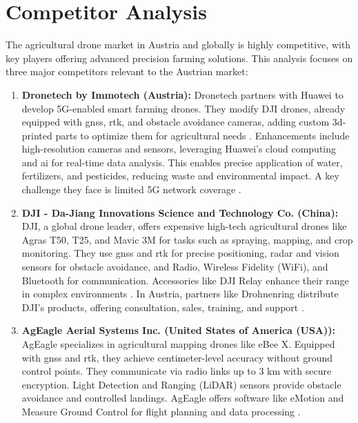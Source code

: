 \section{Competitor Analysis}

The agricultural drone market in Austria and globally is highly competitive, with key players offering advanced precision farming solutions. This analysis focuses on three major competitors relevant to the Austrian market:

\begin{enumerate} 
	\item \textbf{Dronetech by Immotech (Austria):} Dronetech partners with Huawei to develop 5G-enabled smart farming drones. They modify DJI drones, already equipped with \acrfull{gnss}, \acrfull{rtk}, and obstacle avoidance cameras, adding custom \acrshort{3d}-printed parts to optimize them for agricultural needs \cite{dronetech_instagram, dji_m300}. Enhancements include high-resolution cameras and sensors, leveraging Huawei's cloud computing and \acrfull{ai} for real-time data analysis. This enables precise application of water, fertilizers, and pesticides, reducing waste and environmental impact. A key challenge they face is limited 5G network coverage \cite{huawei_dronetech_2022, huawei_boosting_farming_2022, dronetech_smart_farming_project}.
	
	\item \textbf{DJI - Da-Jiang Innovations Science and Technology Co. (China):} DJI, a global drone leader, offers expensive high-tech agricultural drones like Agras T50, T25, and Mavic 3M for tasks such as spraying, mapping, and crop monitoring. They use \acrshort{gnss} and \acrshort{rtk} for precise positioning, radar and vision sensors for obstacle avoidance, and Radio, Wireless Fidelity (WiFi), and Bluetooth for communication. Accessories like DJI Relay enhance their range in complex environments \cite{dji_ag_t25, dji_ag_t50}. In Austria, partners like Drohnenring distribute DJI's products, offering consultation, sales, training, and support \cite{drohnenring_2024}.
	
	\item \textbf{AgEagle Aerial Systems Inc. (United States of America (USA)):} AgEagle specializes in agricultural mapping drones like eBee X. Equipped with \acrshort{gnss} and \acrshort{rtk}, they achieve centimeter-level accuracy without ground control points. They communicate via radio links up to 3 km with secure encryption. Light Detection and Ranging (LiDAR) sensors provide obstacle avoidance and controlled landings. AgEagle offers software like eMotion and Measure Ground Control for flight planning and data processing \cite{ageagle_agriculture_2024, ageagle_agriculture_ebee}.
\end{enumerate}

